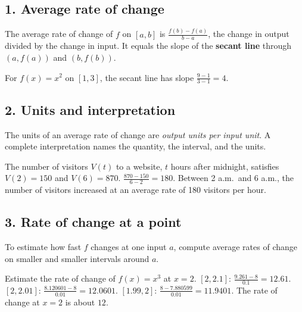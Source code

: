 \subsection*{1. Average rate of change}
\begin{keyidea}
The average rate of change of $f$ on $[a,b]$ is $\displaystyle\frac{f(b)-f(a)}{b-a}$, the change in output divided by the change in input. It equals the slope of the \textbf{secant line} through $(a,f(a))$ and $(b,f(b))$.
\end{keyidea}

\begin{center}

{\small For $f(x)=x^2$ on $[1,3]$, the secant line has slope $\frac{9-1}{3-1}=4$.}
\end{center}

\subsection*{2. Units and interpretation}
The units of an average rate of change are \emph{output units per input unit}. A complete interpretation names the quantity, the interval, and the units.

\begin{example}
The number of visitors $V(t)$ to a website, $t$ hours after midnight, satisfies $V(2)=150$ and $V(6)=870$.
\sol $\frac{870-150}{6-2}=180$. Between 2 a.m.\ and 6 a.m., the number of visitors increased at an average rate of 180 visitors per hour.
\end{example}

\subsection*{3. Rate of change at a point}
To estimate how fast $f$ changes at one input $a$, compute average rates of change on smaller and smaller intervals around $a$.
\begin{example}
Estimate the rate of change of $f(x)=x^3$ at $x=2$.
\sol $[2,2.1]$: $\frac{9.261-8}{0.1}=12.61$. $[2,2.01]$: $\frac{8.120601-8}{0.01}=12.0601$. $[1.99,2]$: $\frac{8-7.880599}{0.01}=11.9401$. The rate of change at $x=2$ is about $12$.
\end{example}

